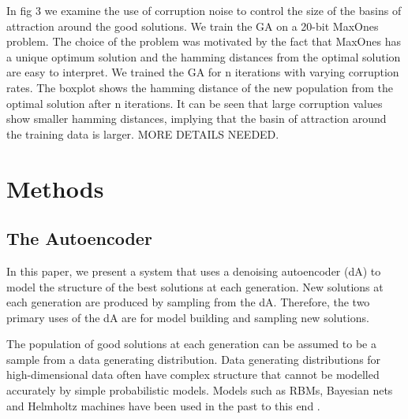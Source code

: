 \documentclass[runningheads,a4paper]{llncs}
\begin{document}
In fig 3 we examine the use of corruption noise to control the size of the basins of attraction around the good solutions. We train the GA on a 20-bit MaxOnes problem. The choice of the problem was motivated by the fact that MaxOnes has a unique optimum solution and the hamming distances from the optimal solution are easy to interpret. We trained the GA for n iterations with varying corruption rates. The boxplot shows the hamming distance of the new population from the optimal solution after n iterations. It can be seen that large corruption values show smaller hamming distances, implying that the basin of attraction around the training data is larger. MORE DETAILS NEEDED.

\section{Methods}

\subsection{The Autoencoder}

In this paper, we present a system that uses a denoising autoencoder (dA) to model the structure of the best solutions at each generation. New solutions at each generation are produced by sampling from the dA. Therefore, the two primary uses of the dA are for model building and sampling new solutions.

The population of good solutions at each generation can be assumed to be a sample from a data generating distribution. Data generating distributions for high-dimensional data often have complex structure that cannot be modelled accurately by simple probabilistic models. Models such as RBMs, Bayesian nets and Helmholtz machines have been used in the past to this end \cite{zhang2000bayesian,tang2010restricted,pelikan2001escaping}.


\end{document}
